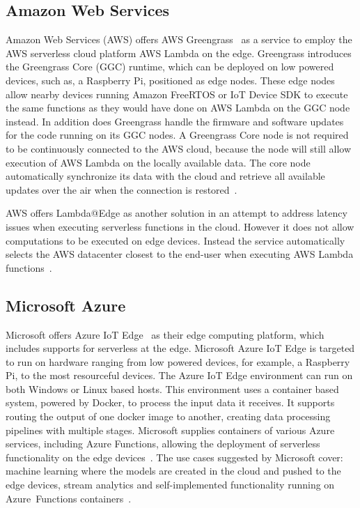 \documentclass[article]{aaltoseries}
\begin{document}
\subsection{Amazon Web Services}
Amazon Web Services (AWS) offers AWS Greengrass~\cite{amazon_aws_nodate} as a service to employ the AWS serverless cloud platform AWS Lambda on the edge.
Greengrass introduces the Greengrass Core (GGC) runtime, which can be deployed on low powered devices, such as, a Raspberry Pi, positioned as edge nodes.
These edge nodes allow nearby devices running Amazon FreeRTOS or IoT Device SDK to execute the same functions as they would have done on AWS Lambda on the GGC node instead.
In addition does Greengrass handle the firmware and software updates for the code running on its GGC nodes.
A Greengrass Core node is not required to be continuously connected to the AWS cloud, because the node will still allow execution of AWS Lambda on the locally available data.
The core node automatically synchronize its data with the cloud and retrieve all available updates over the air when the connection is restored~\cite{amazon_aws_nodate}.

AWS offers Lambda@Edge as another solution in an attempt to address latency issues when executing serverless functions in the cloud.
However it does not allow computations to be executed on edge devices.
Instead the service automatically selects the AWS datacenter closest to the end-user when executing AWS Lambda functions~\cite{amazon_customizing_nodate}.

\subsection{Microsoft Azure} %
Microsoft offers Azure IoT Edge~\cite{microsoft_iot_2018} as their edge computing platform, which includes supports for serverless at the edge.
Microsoft Azure IoT Edge is targeted to run on hardware ranging from low powered devices, for example, a Raspberry Pi, to the most resourceful devices.
The Azure IoT Edge environment can run on both Windows or Linux based hosts.
This environment uses a container based system, powered by Docker, to process the input data it receives.
It supports routing the output of one docker image to another, creating data processing pipelines with multiple stages.
Microsoft supplies containers of various Azure services, including Azure Functions, allowing the deployment of serverless functionality on the edge devices~\cite{microsoft_what_nodate}.
The use cases suggested by Microsoft cover: machine learning where the models are created in the cloud and pushed to the edge devices, stream analytics and self-implemented functionality running on Azure~Functions containers~\cite{microsoft_creating_nodate}.
\end{document}
